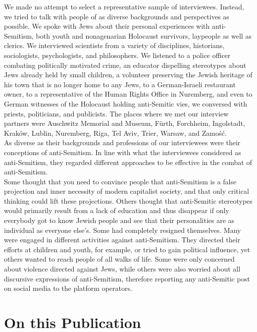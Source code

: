We made no attempt to select a representative sample of interviewees. Instead, we tried to talk with people of as diverse backgrounds and perspectives as possible. We spoke with Jews about their personal experiences with anti-Semitism, both youth and nonagenarian Holocaust survivors, laypeople as well as clerics. We interviewed scientists from a variety of disciplines, historians, sociologists, psychologists, and philosophers. We listened to a police officer combating politically motivated crime, an educator dispelling stereotypes about Jews already held by small children, a volunteer preserving the Jewish heritage of his town that is no longer home to any Jews, to a German-Israeli restaurant owner, to a representative of the Human Rights Office in Nuremberg, and even to German witnesses of the Holocaust holding anti-Semitic vies, we conversed with priests, politicians, and publicists. 
The places where we met our interview partners were Auschwitz Memorial and Museum, Fürth, Forchheim, Ingolstadt, Kraków, Lublin, Nuremberg, Riga, Tel Aviv, Trier, Warsaw, and Zamość. \\
 As diverse as their backgrounds and professions of our interviewees were their conceptions of anti-Semitism. In line with what the interviewees considered as anti-Semitism, they regarded different approaches to be effective in the combat of anti-Semitism.  \\
Some thought that you need to convince people that anti-Semitism is a false projection and inner necessity of modern capitalist society, and that only critical thinking could lift these projections. Others thought that anti-Semitic stereotypes would primarily result from a lack of education and thus disappear if only everybody got to know Jewish people and see that their personalities are as individual as everyone else's. Some had completely resigned themselves. Many were engaged in different activities against anti-Semitism. They directed their efforts at children and youth, for example, or tried to gain political influence, yet others wanted to reach people of all walks of life. Some were only concerned about violence directed against Jews, while others were also worried about all discursive expressions of anti-Semitism, therefore reporting any anti-Semitic post on social media to the platform operators. \\

\section*{On this Publication }

